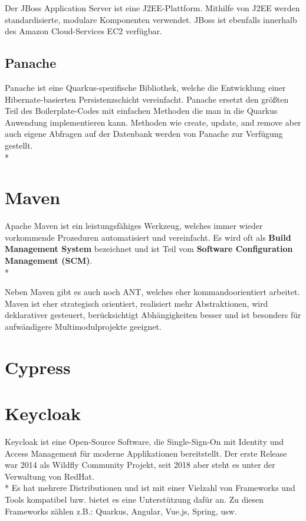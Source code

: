 Der JBoss Application Server ist eine J2EE-Plattform. Mithilfe von J2EE werden standardisierte, modulare Komponenten verwendet.
JBoss ist ebenfalls innerhalb des Amazon Cloud-Services EC2 verfügbar. \cite{JBoss}

\subsection{Panache}
\author{David Ignjatovic}

Panache ist eine Quarkus-spezifische Bibliothek, welche die Entwicklung einer Hibernate-basierten Persistenzschicht vereinfacht. 
Panache ersetzt den größten Teil des Boilerplate-Codes mit einfachen Methoden die man in die Quarkus Anwendung implementieren kann. 
Methoden wie create, update, and remove aber auch eigene Abfragen auf der Datenbank werden von Panache zur Verfügung gestellt. \\* \cite{Panache}


\section{Maven}
\author{David Ignjatovic}

Apache Maven ist ein leistungsfähiges Werkzeug, welches immer wieder vorkommende Prozeduren automatisiert und vereinfacht. 
Es wird oft als \textbf{Build Management System} bezeichnet und ist Teil vom \textbf{Software Configuration Management (SCM)}.  \\* \cite{Maven}

Neben Maven gibt es auch noch ANT, welches eher kommandoorientiert arbeitet. Maven ist eher strategisch orientiert, realisiert mehr Abstraktionen, wird deklarativer gesteuert, 
berücksichtigt Abhängigkeiten besser und ist besonders für aufwändigere Multimodulprojekte geeignet. \cite{Maven}

\section{Cypress}

\section{Keycloak}
\author{Benjamin Besic}
Keycloak ist eine Open-Source Software, die Single-Sign-On mit Identity und Access Management für moderne Applikationen bereitstellt. Der erste Release war 2014 als Wildfly Community Projekt, seit 2018 aber steht es unter der Verwaltung von RedHat. \cite{KeycloakWiki}  \\* 
Es hat mehrere Distributionen und ist mit einer Vielzahl von Frameworks und Tools kompatibel bzw. bietet es eine Unterstützung dafür an. Zu diesen Frameworks zählen z.B.: Quarkus, Angular, Vue.js, Spring, usw. \cite{KeyCloakDZone}

